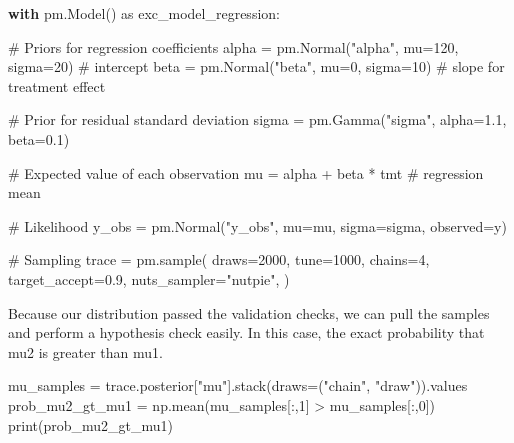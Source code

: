 \documentclass[
  letterpaper,
  DIV=11,
  numbers=noendperiod]{scrartcl}
\newenvironment{Shaded}{\begin{snugshade}}{\end{snugshade}}
\newcommand{\BuiltInTok}[1]{\textcolor[rgb]{0.00,0.23,0.31}{#1}}
\newcommand{\CommentTok}[1]{\textcolor[rgb]{0.37,0.37,0.37}{#1}}
\newcommand{\ControlFlowTok}[1]{\textcolor[rgb]{0.00,0.23,0.31}{\textbf{#1}}}
\newcommand{\DecValTok}[1]{\textcolor[rgb]{0.68,0.00,0.00}{#1}}
\newcommand{\FloatTok}[1]{\textcolor[rgb]{0.68,0.00,0.00}{#1}}
\newcommand{\ImportTok}[1]{\textcolor[rgb]{0.00,0.46,0.62}{#1}}
\newcommand{\NormalTok}[1]{\textcolor[rgb]{0.00,0.23,0.31}{#1}}
\newcommand{\OperatorTok}[1]{\textcolor[rgb]{0.37,0.37,0.37}{#1}}
\newcommand{\StringTok}[1]{\textcolor[rgb]{0.13,0.47,0.30}{#1}}
\begin{document}
\begin{Shaded}
\begin{Highlighting}[]
\ControlFlowTok{with}\NormalTok{ pm.Model() }\ImportTok{as}\NormalTok{ exc\_model\_regression:}

    \CommentTok{\# Priors for regression coefficients}
\NormalTok{    alpha }\OperatorTok{=}\NormalTok{ pm.Normal(}\StringTok{"alpha"}\NormalTok{, mu}\OperatorTok{=}\DecValTok{120}\NormalTok{, sigma}\OperatorTok{=}\DecValTok{20}\NormalTok{)        }\CommentTok{\# intercept}
\NormalTok{    beta  }\OperatorTok{=}\NormalTok{ pm.Normal(}\StringTok{"beta"}\NormalTok{, mu}\OperatorTok{=}\DecValTok{0}\NormalTok{,   sigma}\OperatorTok{=}\DecValTok{10}\NormalTok{)         }\CommentTok{\# slope for treatment effect}

    \CommentTok{\# Prior for residual standard deviation}
\NormalTok{    sigma }\OperatorTok{=}\NormalTok{ pm.Gamma(}\StringTok{"sigma"}\NormalTok{, alpha}\OperatorTok{=}\FloatTok{1.1}\NormalTok{, beta}\OperatorTok{=}\FloatTok{0.1}\NormalTok{)}

    \CommentTok{\# Expected value of each observation}
\NormalTok{    mu }\OperatorTok{=}\NormalTok{ alpha }\OperatorTok{+}\NormalTok{ beta }\OperatorTok{*}\NormalTok{ tmt   }\CommentTok{\# regression mean}

    \CommentTok{\# Likelihood}
\NormalTok{    y\_obs }\OperatorTok{=}\NormalTok{ pm.Normal(}\StringTok{"y\_obs"}\NormalTok{, mu}\OperatorTok{=}\NormalTok{mu, sigma}\OperatorTok{=}\NormalTok{sigma, observed}\OperatorTok{=}\NormalTok{y)}

    \CommentTok{\# Sampling}
\NormalTok{    trace }\OperatorTok{=}\NormalTok{ pm.sample(}
\NormalTok{        draws}\OperatorTok{=}\DecValTok{2000}\NormalTok{,}
\NormalTok{        tune}\OperatorTok{=}\DecValTok{1000}\NormalTok{,}
\NormalTok{        chains}\OperatorTok{=}\DecValTok{4}\NormalTok{,}
\NormalTok{        target\_accept}\OperatorTok{=}\FloatTok{0.9}\NormalTok{,}
\NormalTok{        nuts\_sampler}\OperatorTok{=}\StringTok{"nutpie"}\NormalTok{,}
\NormalTok{    )}
\end{Highlighting}
\end{Shaded}

Because our distribution passed the validation checks, we can pull the
samples and perform a hypothesis check easily. In this case, the exact
probability that mu2 is greater than mu1.

\begin{Shaded}
\begin{Highlighting}[]
\NormalTok{mu\_samples }\OperatorTok{=}\NormalTok{ trace.posterior[}\StringTok{"mu"}\NormalTok{].stack(draws}\OperatorTok{=}\NormalTok{(}\StringTok{"chain"}\NormalTok{, }\StringTok{"draw"}\NormalTok{)).values}
\NormalTok{prob\_mu2\_gt\_mu1 }\OperatorTok{=}\NormalTok{ np.mean(mu\_samples[:,}\DecValTok{1}\NormalTok{] }\OperatorTok{\textgreater{}}\NormalTok{ mu\_samples[:,}\DecValTok{0}\NormalTok{])}
\BuiltInTok{print}\NormalTok{(prob\_mu2\_gt\_mu1)}
\end{Highlighting}
\end{Shaded}
\end{document}
